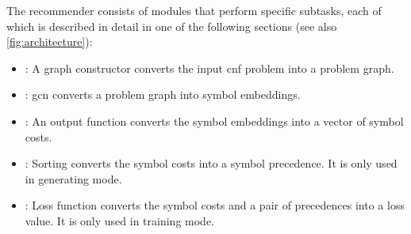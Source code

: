 The recommender consists of modules that perform specific subtasks,
each of which is described in detail in one of the following sections (see also \cref{fig:architecture}):
\begin{itemize}
\item {}: A graph constructor converts the input \gls{cnf} problem into a problem graph.
\item {}: \Gls{gcn} converts a problem graph into symbol embeddings.
\item {}: An output function converts the symbol embeddings into a vector of symbol costs.
\item {}: Sorting converts the symbol costs into a symbol precedence.
It is only used in generating mode.
\item {}: Loss function converts the symbol costs and a pair of precedences into a loss value.
It is only used in training mode.
\end{itemize}

